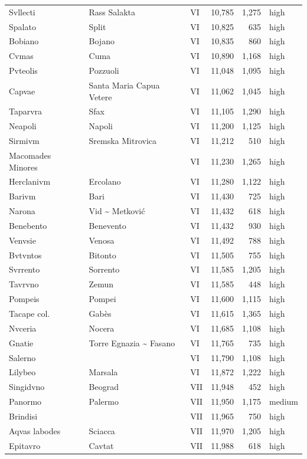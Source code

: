 \documentclass[11pt,a4paper]{article}
\begin{document}
{\begin{longtable}{p{4.6cm}p{5.2cm}lrrl}
Svllecti & Rass Salakta & VI & 10,785 & 1,275 & high\\
Spalato & Split & VI & 10,825 & 635 & high\\
Bobiano & Bojano & VI & 10,835 & 860 & high\\
Cvmas & Cuma & VI & 10,890 & 1,168 & high\\
Pvteolis & Pozzuoli & VI & 11,048 & 1,095 & high\\
Capvae & Santa Maria Capua Vetere & VI & 11,062 & 1,045 & high\\
Taparvra & Sfax & VI & 11,105 & 1,290 & high\\
Neapoli & Napoli & VI & 11,200 & 1,125 & high\\
Sirmivm & Sremska Mitrovica & VI & 11,212 & 510 & high\\
Macomades Minores &  & VI & 11,230 & 1,265 & high\\
Herclanivm & Ercolano & VI & 11,280 & 1,122 & high\\
Barivm & Bari & VI & 11,430 & 725 & high\\
Narona & Vid \textasciitilde{} Metković & VI & 11,432 & 618 & high\\
Benebento & Benevento & VI & 11,432 & 930 & high\\
Venvsie & Venosa & VI & 11,492 & 788 & high\\
Bvtvntos & Bitonto & VI & 11,505 & 755 & high\\
Svrrento & Sorrento & VI & 11,585 & 1,205 & high\\
Tavrvno & Zemun & VI & 11,585 & 448 & high\\
Pompeis & Pompei & VI & 11,600 & 1,115 & high\\
Tacape col. & Gabès & VI & 11,615 & 1,365 & high\\
Nvceria & Nocera & VI & 11,685 & 1,108 & high\\
Gnatie & Torre Egnazia \textasciitilde{} Fasano & VI & 11,765 & 735 & high\\
Salerno &  & VI & 11,790 & 1,108 & high\\
Lilybeo & Marsala & VI & 11,872 & 1,222 & high\\
Singidvno & Beograd & VII & 11,948 & 452 & high\\
Panormo & Palermo & VII & 11,950 & 1,175 & medium\\
Brindisi &  & VII & 11,965 & 750 & high\\
Aqvas labodes & Sciacca & VII & 11,970 & 1,205 & high\\
Epitavro & Cavtat & VII & 11,988 & 618 & high\\

\end{longtable}}
\end{document}
